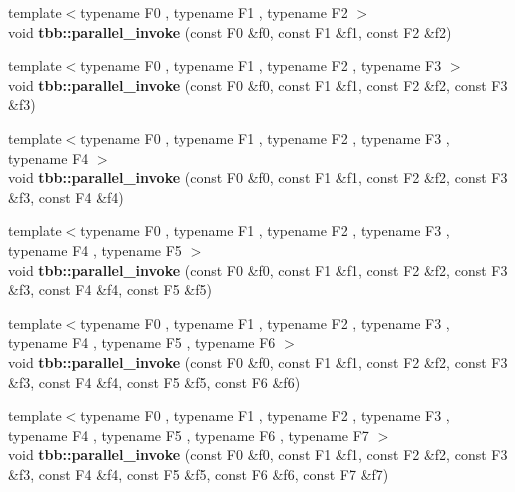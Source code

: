 \begin{DoxyCompactItemize}
\item 
\hypertarget{group__algorithms_gaa979656a4c207782b74800c6c42982f5}{}{\footnotesize template$<$typename F0 , typename F1 , typename F2 $>$ }\\void {\bfseries tbb\+::parallel\+\_\+invoke} (const F0 \&f0, const F1 \&f1, const F2 \&f2)\label{group__algorithms_gaa979656a4c207782b74800c6c42982f5}

\item 
\hypertarget{group__algorithms_ga219cb8061b7cf5454c0bc4d67cff1e34}{}{\footnotesize template$<$typename F0 , typename F1 , typename F2 , typename F3 $>$ }\\void {\bfseries tbb\+::parallel\+\_\+invoke} (const F0 \&f0, const F1 \&f1, const F2 \&f2, const F3 \&f3)\label{group__algorithms_ga219cb8061b7cf5454c0bc4d67cff1e34}

\item 
\hypertarget{group__algorithms_ga8319ee980cd7cfb03f12ffc2a5ea4895}{}{\footnotesize template$<$typename F0 , typename F1 , typename F2 , typename F3 , typename F4 $>$ }\\void {\bfseries tbb\+::parallel\+\_\+invoke} (const F0 \&f0, const F1 \&f1, const F2 \&f2, const F3 \&f3, const F4 \&f4)\label{group__algorithms_ga8319ee980cd7cfb03f12ffc2a5ea4895}

\item 
\hypertarget{group__algorithms_ga295daf6f7394fba29a979b914be09fc6}{}{\footnotesize template$<$typename F0 , typename F1 , typename F2 , typename F3 , typename F4 , typename F5 $>$ }\\void {\bfseries tbb\+::parallel\+\_\+invoke} (const F0 \&f0, const F1 \&f1, const F2 \&f2, const F3 \&f3, const F4 \&f4, const F5 \&f5)\label{group__algorithms_ga295daf6f7394fba29a979b914be09fc6}

\item 
\hypertarget{group__algorithms_ga7652a01622a2f28df1e0edf40b691190}{}{\footnotesize template$<$typename F0 , typename F1 , typename F2 , typename F3 , typename F4 , typename F5 , typename F6 $>$ }\\void {\bfseries tbb\+::parallel\+\_\+invoke} (const F0 \&f0, const F1 \&f1, const F2 \&f2, const F3 \&f3, const F4 \&f4, const F5 \&f5, const F6 \&f6)\label{group__algorithms_ga7652a01622a2f28df1e0edf40b691190}

\item 
\hypertarget{group__algorithms_gadd8826371866c58e41dee3546c35d2c8}{}{\footnotesize template$<$typename F0 , typename F1 , typename F2 , typename F3 , typename F4 , typename F5 , typename F6 , typename F7 $>$ }\\void {\bfseries tbb\+::parallel\+\_\+invoke} (const F0 \&f0, const F1 \&f1, const F2 \&f2, const F3 \&f3, const F4 \&f4, const F5 \&f5, const F6 \&f6, const F7 \&f7)\label{group__algorithms_gadd8826371866c58e41dee3546c35d2c8}


\end{DoxyCompactItemize}
